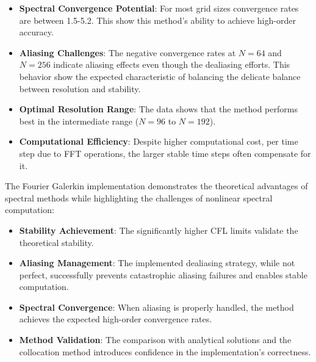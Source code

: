 \begin{itemize}
	\item \textbf{Spectral Convergence Potential}: For most grid sizes convergence rates are between 1.5-5.2. This show this method's ability to achieve high-order accuracy.
	\item \textbf{Aliasing Challenges}: The negative convergence rates at $N=64$ and $N=256$ indicate aliasing effects even though the dealiasing efforts. This behavior show the expected characteristic of balancing the delicate balance between resolution and stability.
	\item \textbf{Optimal Resolution Range}: The data shows that the method performs best in the intermediate range ($N=96$ to $N=192$).
	\item \textbf{Computational Efficiency}: Despite higher computational cost, per time step due to FFT operations, the larger stable time steps often compensate for it.
\end{itemize}
The Fourier Galerkin implementation demonstrates the theoretical advantages of spectral methods while highlighting the challenges of nonlinear spectral computation:
\begin{itemize}
	\item \textbf{Stability Achievement}: The significantly higher CFL limits validate the theoretical stability. 
	\item \textbf{Aliasing Management}: The implemented dealiasing strategy, while not perfect, successfully prevents catastrophic aliasing failures and enables stable computation.
	\item \textbf{Spectral Convergence}: When aliasing is properly handled, the method achieves the expected high-order convergence rates. 
	\item \textbf{Method Validation}: The comparison with analytical solutions and the collocation method introduces confidence in the implementation's correctness. 
\end{itemize}
%
